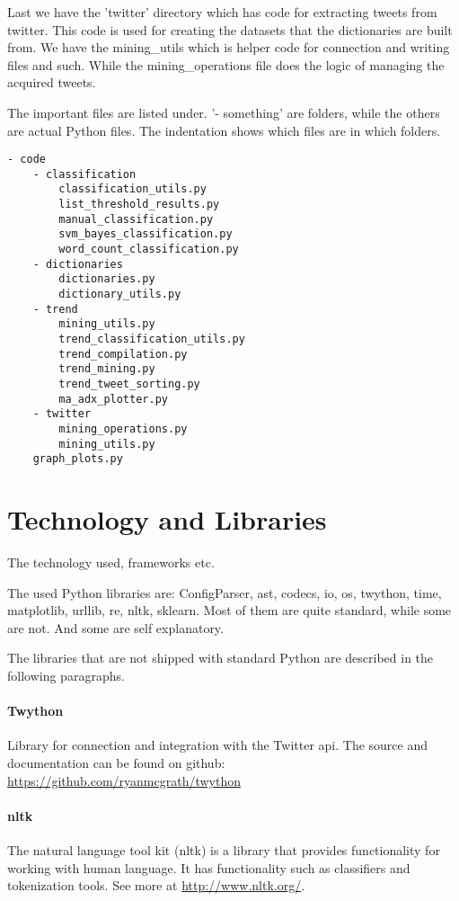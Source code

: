Last we have the 'twitter' directory which has code for extracting tweets from
twitter. This code is used for creating the datasets that the dictionaries are
built from. We have the mining\_utils which is helper code for connection and
writing files and such. While the mining\_operations file does the logic of
managing the acquired tweets. 

The important files are listed under. '- something' are folders, while the
others are actual Python files. The indentation shows which files are in which
folders.  
\begin{verbatim}
- code    
    - classification
        classification_utils.py
		list_threshold_results.py
        manual_classification.py
        svm_bayes_classification.py
        word_count_classification.py
    - dictionaries
        dictionaries.py
        dictionary_utils.py
    - trend    
        mining_utils.py
        trend_classification_utils.py
        trend_compilation.py
        trend_mining.py
        trend_tweet_sorting.py
        ma_adx_plotter.py  
    - twitter
        mining_operations.py
        mining_utils.py
    graph_plots.py
\end{verbatim}

\section{Technology and Libraries}\label{code:technology_libraries}
The technology used, frameworks etc.

The used Python libraries are: ConfigParser, ast, codecs, io, os, twython,
time, matplotlib, urllib, re, nltk, sklearn.
Most of them are quite standard, while some are not. And some are self
explanatory. 

The libraries that are not shipped with standard Python are described in the
following paragraphs. 

\paragraph{Twython}
Library for connection and integration with the Twitter api. 
The source and documentation can be found on github:
\url{https://github.com/ryanmcgrath/twython}

\paragraph{nltk}
The natural language tool kit (nltk) is a library that provides functionality
for working with human language. It has functionality such as classifiers and
tokenization tools. See more at \url{http://www.nltk.org/}.

